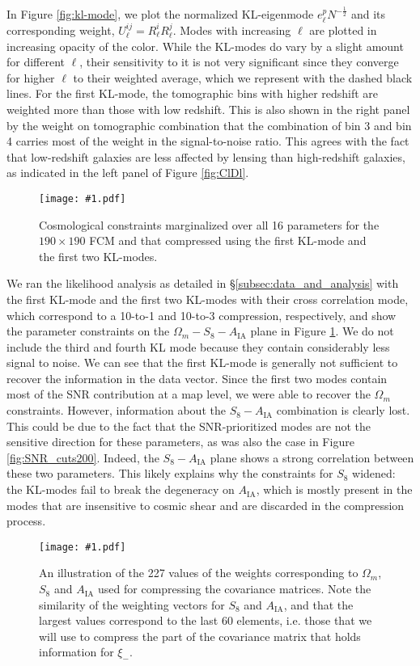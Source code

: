 \documentclass[aps, prd, twocolumn, superscriptaddress, nofootinbib, amssymb, amsmath]{revtex4-2}
\newcommand{\sfig}[3]{
	\texttt{[image: \#1.pdf]}
	\caption{#3}
	\label{fig:#1}
}
\newcommand{\Sfig}[3]{
	\begin{figure}[#1]
		\sfig{#2}{\columnwidth}{#3}
	\end{figure}
}
\newcommand{\Swide}[3]{
	\begin{figure*}[#1]
		\sfig{#2}{\textwidth}{#3}
	\end{figure*}
}
\newcommand{\rf}[1]{Figure \ref{fig:#1}}
\newcommand{\rssec}[1]{\S\ref{subsec:#1}}
\begin{document}
In \rf{kl-mode}, we plot the normalized KL-eigenmode $e^p_{\ell} N^{-\frac{1}{2}}$ and its corresponding weight, $U^{ij}_\ell=R_\ell^i R_\ell^j$. Modes with increasing $\ell$ are plotted in increasing opacity of the color. While the KL-modes do vary by a slight amount for different $\ell$, their sensitivity to it is not very significant since they converge for higher $\ell$ to their weighted average, which we represent with the dashed black lines. For the first KL-mode, the tomographic bins with higher redshift are weighted more than those with low redshift. This is also shown in the right panel by the weight on tomographic combination that the combination of bin 3 and bin 4 carries most of the weight in the signal-to-noise ratio. This agrees with the fact that low-redshift galaxies are less affected by lensing than high-redshift galaxies, as indicated in the left panel of \rf{ClDl}.

\Sfig{b}{CompKL-constraints_wmS8A}{Cosmological constraints marginalized over all 16 parameters for the  $190 \times 190$ FCM and that compressed using the first KL-mode and the first two KL-modes.}

We ran the likelihood analysis as detailed in \rssec{data_and_analysis} with the first KL-mode and the first two KL-modes with their cross correlation mode, which correspond to a 10-to-1 and 10-to-3 compression, respectively, and show the parameter constraints on the $\Omega_m - S_8 - A_{\text{IA}}$ plane in \rf{CompKL-constraints_wmS8A}. We do not include the third and fourth KL mode because they contain considerably less signal to noise. We can see that the first KL-mode is generally not sufficient to recover the information in the data vector. Since the first two modes contain most of the SNR contribution at a map level, we were able to recover the $\Omega_m$ constraints. However, information about the $S_8-A_{\text{IA}}$ combination is clearly lost. This could be due to the fact that the SNR-prioritized modes are not the sensitive direction for these parameters, as was also the case in \rf{SNR_cuts200}. Indeed, the $S_8 - A_{\text{IA}}$ plane shows a strong correlation between these two parameters. This likely explains why the constraints for $S_8$ widened: the KL-modes fail to break the degeneracy on $A_{\text{IA}}$, which is mostly present in the modes that are insensitive to cosmic shear and are discarded in the compression process.

\Swide{tbp}{Weights_2pt}{An illustration of the 227 values of the weights corresponding to $\Omega_m$, $S_8$ and $A_{\text{IA}}$ used for compressing the covariance matrices. Note the similarity of the weighting vectors for $S_8$ and $A_{\text{IA}}$, and that the largest values correspond to the last 60 elements, i.e. those that we will use to compress the part of the covariance matrix that holds information for $\xi_-$.}
\end{document}
